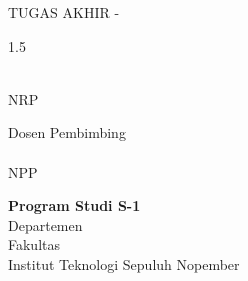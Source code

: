 \begin{large}
  TUGAS AKHIR - \coursecode{}
\end{large}

\vspace{\fill}

\begin{spacing}{1.5}
  \begin{LARGE}
    \textbf{\tatitle{}}
  \end{LARGE}
\end{spacing}

\vspace{\fill}

\begin{large}
  \textbf{\name{}} \\
  \textmd{NRP \nrp{}}

  \vspace{\fill}

  \textmd{Dosen Pembimbing} \\
  \textbf{\advisor{}} \\
  \textmd{NPP \advisornip{}} \\

  \vspace{\fill}

  \textbf{Program Studi S-1 \studyprogram{}} \\

  Departemen \department{} \\
  Fakultas \faculty{} \\
  Institut Teknologi Sepuluh Nopember \\
  \place{} \\
  \the\year{}
\end{large}